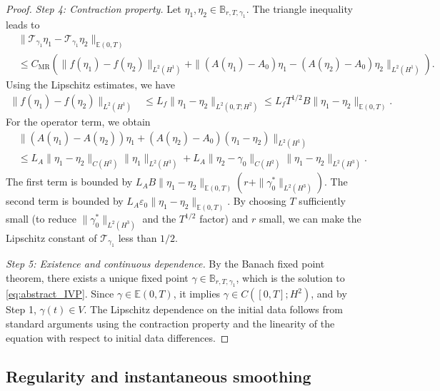 \documentclass{article}
\theoremstyle{remark}
\theoremstyle{definition}
\numberwithin{equation}{section}
\begin{document}
\begin{proof}
    \textit{Step 4: Contraction property.}
    Let $\eta_1, \eta_2 \in \mathbb{B}_{r,T,\gamma_1}$. The triangle inequality leads to
    \begin{align*}
        &\|\mathcal{T}_{\gamma_1}\eta_1 - \mathcal{T}_{\gamma_1}\eta_2\|_{\mathbb{E}(0,T)} \\
        &\le C_{\mathrm{MR}} \left( \|f(\eta_1) - f(\eta_2)\|_{L^2(H^1)} + \|(A(\eta_1) - A_0)\eta_1 - (A(\eta_2) - A_0)\eta_2\|_{L^2(H^1)} \right).
    \end{align*}
    Using the Lipschitz estimates, we have
    \begin{align*}
        \|f(\eta_1) - f(\eta_2)\|_{L^2(H^1)} 
        &\le L_f \|\eta_1 - \eta_2\|_{L^2(0,T;H^2)} 
        \le L_f T^{1/2} B \|\eta_1 - \eta_2\|_{\mathbb{E}(0,T)}.
    \end{align*}
    For the operator term, we obtain
    \begin{align*}
        &\|(A(\eta_1) - A(\eta_2))\eta_1 + (A(\eta_2) - A_0)(\eta_1 - \eta_2)\|_{L^2(H^1)} \\
        &\le L_A \|\eta_1 - \eta_2\|_{C(H^2)} \|\eta_1\|_{L^2(H^3)} + L_A \|\eta_2 - \gamma_0\|_{C(H^2)} \|\eta_1 - \eta_2\|_{L^2(H^3)}.
    \end{align*}
    The first term is bounded by $L_A B \|\eta_1-\eta_2\|_{\mathbb{E}(0,T)} (r + \|\gamma_0^\ast\|_{L^2(H^3)})$.
    The second term is bounded by $L_A \varepsilon_0 \|\eta_1 - \eta_2\|_{\mathbb{E}(0,T)}$.
    By choosing $T$ sufficiently small (to reduce $\|\gamma_0^\ast\|_{L^2(H^3)}$ and the $T^{1/2}$ factor) and $r$ small, we can make the Lipschitz constant of $\mathcal{T}_{\gamma_1}$ less than $1/2$.

    \textit{Step 5: Existence and continuous dependence.}
    By the Banach fixed point theorem, there exists a unique fixed point $\gamma \in \mathbb{B}_{r,T,\gamma_1}$, which is the solution to \eqref{eq:abstract_IVP}.
    Since $\gamma \in \mathbb{E}(0,T)$, it implies $\gamma \in C([0,T]; H^2)$, and by Step 1, $\gamma(t) \in V$.
    The Lipschitz dependence on the initial data follows from standard arguments using the contraction property and the linearity of the equation with respect to initial data differences.
\end{proof}





\subsection{Regularity and instantaneous smoothing}
\end{document}
